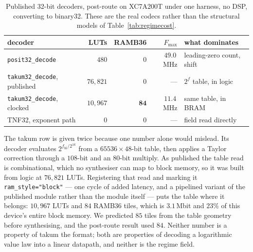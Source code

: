 \documentclass[11pt]{article}
\theoremstyle{definition}
\begin{document}
\begin{table}[t]\centering
\caption{Published 32-bit decoders, post-route on XC7A200T under one harness, no
DSP, converting to binary32. These are the real codecs rather than the structural
models of Table~\ref{tab:regimecost}.}
\label{tab:realcodecs}
\begin{tabular}{lrrrl}
\toprule
decoder & LUTs & RAMB36 & $F_{\max}$ & what dominates \\
\midrule
\texttt{posit32\_decode} & $480$ & $0$ & $49.0$\,MHz & leading-zero count, shift \\
\texttt{takum32\_decode}, published & $76{,}821$ & $0$ & --- & $2^{f}$ table, in logic \\
\texttt{takum32\_decode}, clocked & $10{,}967$ & $\mathbf{84}$ & $11.4$\,MHz & same table, in BRAM \\
TNF32, exponent path & $0$ & $0$ & --- & field read directly \\
\bottomrule
\end{tabular}
\end{table}

The takum row is given twice because one number alone would mislead. Its decoder
evaluates $2^{f_{\mathrm{hi}}/2^{16}}$ from a $65536 \times 48$-bit table, then
applies a Taylor correction through a $108$-bit and an $80$-bit multiply. As
published the table read is combinational, which no synthesiser can map to block
memory, so it was built from logic at $76{,}821$ LUTs. Registering that read and
marking it \texttt{ram\_style="block"} --- one cycle of added latency, and a
pipelined variant of the published module rather than the module itself --- puts
the table where it belongs: $10{,}967$ LUTs and $84$ RAMB36 tiles, which is
$3.1$\,Mbit and $23\%$ of this device's entire block memory. We predicted $85$
tiles from the table geometry before synthesising, and the post-route result used $84$. Neither
number is a property of takum the format; both are properties of decoding a
logarithmic value law into a linear datapath, and neither is the regime field.
\end{document}
